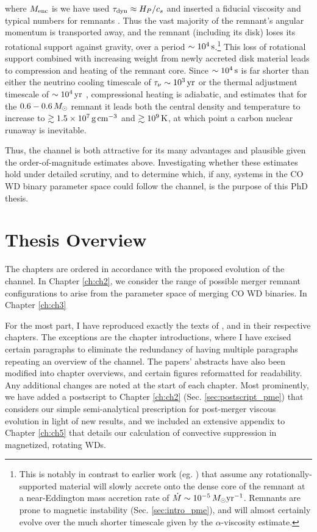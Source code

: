 \noindent where $M_\mathrm{enc}$ is we have used $\taudyn \approx H_P/c_s$ and inserted a fiducial viscosity and typical numbers for remnants \citep{shen+12}.  Thus the vast majority of the remnant's angular momentum is transported away, and the remnant (including its disk) loses its rotational support against gravity, over a period $\sim10^4\,\mathrm{s}$.\footnote{This is notably in contrast to earlier work (eg. \citep{nomoi85, yoonpr07}) that assume any rotationally-supported material will slowly accrete onto the dense core of the remnant at a near-Eddington mass accretion rate of $\dot{M} \sim 10^{-5}\,\Msun\pyr$.  Remnants are prone to magnetic instability (Sec. \ref{sec:intro_pme}), and will almost certainly evolve over the much shorter timescale given by the $\alpha$-viscosity estimate.}  This loss of rotational support combined with increasing weight from newly accreted disk material leads to compression and heating of the remnant core.  Since $\sim10^4\,\mathrm{s}$ is far shorter than either the neutrino cooling timescale of $\taunu \sim 10^3\,\mrm{yr}$ or the thermal adjustment timescale of $\sim10^4\,\mathrm{yr}$ \citep{shen+12}, compressional heating is adiabatic, and \citeal{vkercj10} estimates that for the $0.6-0.6\,\Msun$ remnant it leads both the central density and temperature to increase to $\gtrsim1.5\times10^7\,\gcc$ and $\gtrsim10^9\,\mathrm{K}$, at which point a carbon nuclear runaway is inevitable.

Thus, the \citeal{vkercj10} channel is both attractive for its many advantages and plausible given the order-of-magnitude estimates above.  Investigating whether these estimates hold under detailed scrutiny, and to determine which, if any, systems in the CO WD binary parameter space could follow the channel, is the purpose of this PhD thesis.


\section{Thesis Overview}

The chapters are ordered in accordance with the proposed evolution of the \citeal{vkercj10} channel.  In Chapter \ref{ch:ch2}, we consider the range of possible merger remnant configurations to arise from the parameter space of merging CO WD binaries.  In Chapter \ref{ch:ch3}

For the most part, I have reproduced exactly the texts of \citeal{zhu+13}, \citeal{zhu+15} and \citeal{zhu+16} in their respective chapters.  The exceptions are the chapter introductions, where I have excised certain paragraphs to eliminate the redundancy of having multiple paragraphs repeating an overview of the \citeal{vkercj10} channel.  The papers' abstracts have also been modified into chapter overviews, and certain figures reformatted for readability.  Any additional changes are noted at the start of each chapter.  Most prominently, we have added a postscript to Chapter \ref{ch:ch2} (Sec. \ref{sec:postscript_pme}) that considers our simple semi-analytical prescription for post-merger viscous evolution in light of new results, and we included an extensive appendix to Chapter \ref{ch:ch5} that details our calculation of convective suppression in magnetized, rotating WDs.

